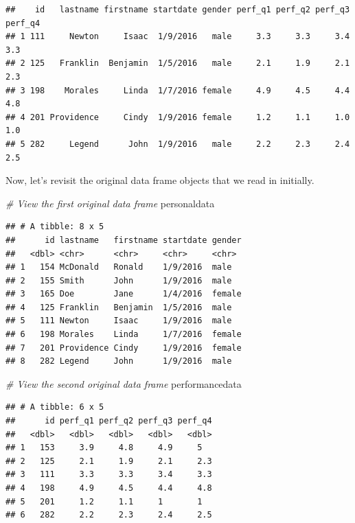 \documentclass[]{book}
\newenvironment{Shaded}{\begin{snugshade}}{\end{snugshade}}
\newcommand{\CommentTok}[1]{\textcolor[rgb]{0.56,0.35,0.01}{\textit{#1}}}
\newcommand{\NormalTok}[1]{#1}
\begin{document}
\begin{verbatim}
##    id   lastname firstname startdate gender perf_q1 perf_q2 perf_q3 perf_q4
## 1 111     Newton     Isaac  1/9/2016   male     3.3     3.3     3.4     3.3
## 2 125   Franklin  Benjamin  1/5/2016   male     2.1     1.9     2.1     2.3
## 3 198    Morales     Linda  1/7/2016 female     4.9     4.5     4.4     4.8
## 4 201 Providence     Cindy  1/9/2016 female     1.2     1.1     1.0     1.0
## 5 282     Legend      John  1/9/2016   male     2.2     2.3     2.4     2.5
\end{verbatim}

Now, let's revisit the original data frame objects that we read in
initially.

\begin{Shaded}
\begin{Highlighting}[]
\CommentTok{# View the first original data frame}
\NormalTok{personaldata}
\end{Highlighting}
\end{Shaded}

\begin{verbatim}
## # A tibble: 8 x 5
##      id lastname   firstname startdate gender
##   <dbl> <chr>      <chr>     <chr>     <chr> 
## 1   154 McDonald   Ronald    1/9/2016  male  
## 2   155 Smith      John      1/9/2016  male  
## 3   165 Doe        Jane      1/4/2016  female
## 4   125 Franklin   Benjamin  1/5/2016  male  
## 5   111 Newton     Isaac     1/9/2016  male  
## 6   198 Morales    Linda     1/7/2016  female
## 7   201 Providence Cindy     1/9/2016  female
## 8   282 Legend     John      1/9/2016  male
\end{verbatim}

\begin{Shaded}
\begin{Highlighting}[]
\CommentTok{# View the second original data frame}
\NormalTok{performancedata}
\end{Highlighting}
\end{Shaded}

\begin{verbatim}
## # A tibble: 6 x 5
##      id perf_q1 perf_q2 perf_q3 perf_q4
##   <dbl>   <dbl>   <dbl>   <dbl>   <dbl>
## 1   153     3.9     4.8     4.9     5  
## 2   125     2.1     1.9     2.1     2.3
## 3   111     3.3     3.3     3.4     3.3
## 4   198     4.9     4.5     4.4     4.8
## 5   201     1.2     1.1     1       1  
## 6   282     2.2     2.3     2.4     2.5
\end{verbatim}
\end{document}
